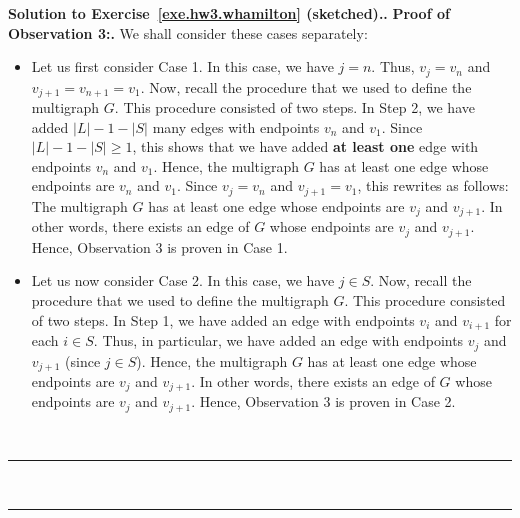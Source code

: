 \documentclass[numbers=enddot,12pt,final,onecolumn,notitlepage]{scrartcl}%
\theoremstyle{definition}
\newenvironment{proof}[1][Proof]{\noindent\textbf{#1.} }{\ \rule{0.5em}{0.5em}}
\newcommand{\set}[1]{\left\{ #1 \right\}}
\newcommand{\abs}[1]{\left| #1 \right|}
\newcommand{\ive}[1]{\left[ #1 \right]}
\begin{document}
\begin{proof}[Solution to Exercise~\ref{exe.hw3.whamilton}
(sketched).]
\begin{proof}[Proof of Observation 3:]
We shall consider these cases separately:

\begin{itemize}

\item Let us first consider Case 1.
      In this case, we have $j = n$.
      Thus, $v_j = v_n$ and $v_{j+1} = v_{n+1} = v_1$.
      Now, recall the procedure that we used to define the multigraph
      $G$.
      This procedure consisted of two steps.
      In Step 2, we have added $\abs{L} - 1 - \abs{S}$ many edges with
      endpoints $v_n$ and $v_1$.
      Since $\abs{L} - 1 - \abs{S} \geq 1$, this shows that we have
      added \textbf{at least one} edge with endpoints $v_n$ and $v_1$.
      Hence, the multigraph $G$ has at least one edge whose endpoints
      are $v_n$ and $v_1$.
      Since $v_j = v_n$ and $v_{j+1} = v_1$, this rewrites as follows:
      The multigraph $G$ has at least one edge whose endpoints are
      $v_j$ and $v_{j+1}$.
      In other words, there exists an edge of $G$ whose endpoints are
      $v_j$ and $v_{j+1}$.
      Hence, Observation 3 is proven in Case 1.

\item Let us now consider Case 2.
      In this case, we have $j \in S$.
      Now, recall the procedure that we used to define the multigraph
      $G$.
      This procedure consisted of two steps.
      In Step 1, we have added an edge with endpoints $v_i$ and
      $v_{i+1}$ for each $i \in S$.
      Thus, in particular, we have added an edge with endpoints $v_j$
      and $v_{j+1}$ (since $j \in S$).
      Hence, the multigraph $G$ has at least one edge whose endpoints
      are $v_j$ and $v_{j+1}$.
      In other words, there exists an edge of $G$ whose endpoints are
      $v_j$ and $v_{j+1}$.
      Hence, Observation 3 is proven in Case 2.


\end{itemize}
\end{proof}
\end{proof}
\end{document}
